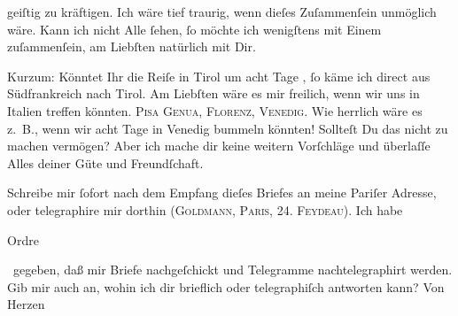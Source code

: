                geiſtig zu kräftigen. Ich wäre tief traurig, wenn dieſes Zuſammenſein unmöglich wäre.
               Kann {\pb}ich nicht Alle ſehen, ſo möchte ich wenigſtens
               mit Einem zuſammenſein, am Liebſten natürlich mit Dir.\pend
           
\pstart
           Kurzum: Könntet Ihr die Reiſe in Tirol um
               acht Tage \label{K_L02610-3v}\label{K_L02610-3}, ſo käme ich direct aus Südfrankreich nach Tirol. Am
               Liebſten wäre es mir freilich, wenn wir uns in Italien treffen könnten. \textsc{Pisa}{ }\textsc{Genua}, \textsc{Florenz}, \textsc{Venedig}. Wie herrlich wäre es z. B., wenn wir acht Tage in Venedig bummeln könnten! Sollteſt Du das nicht zu {\pb}machen vermögen? Aber ich mache dir keine weitern Vorſchläge und überlaſſe Alles
               deiner Güte und Freundſchaft.\pend
           
\pstart
           Schreibe mir ſofort nach dem Empfang dieſes Briefes an meine Pariſer Adresse, oder telegraphire mir dorthin (\textsc{Goldmann}, \textsc{Paris, 24. Feydeau}). Ich habe \begin{otherlanguage}{french}Ordre\end{otherlanguage} gegeben, daß mir Briefe
               nachgeſchickt und Telegramme nachtelegraphirt werden. Gib mir auch an, wohin ich dir
               brieflich oder telegraphiſch antworten kann? Von Herzen\pend
           
